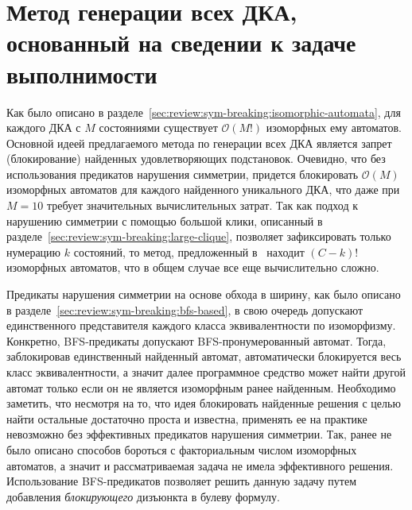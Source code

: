 
\section{Метод генерации всех ДКА, основанный на сведении к задаче выполнимости}
\label{sec:findall:SAT-based}

Как было описано в разделе~\ref{sec:review:sym-breaking:isomorphic-automata}, для каждого ДКА с $M$ состояниями существует $\mathcal{O}\left(M!\right)$ изоморфных ему автоматов.
Основной идеей предлагаемого метода по генерации всех ДКА является запрет (блокирование) найденных удовлетворяющих подстановок.
Очевидно, что без использования предикатов нарушения симметрии, придется блокировать $\mathcal{O}\left(M\right)$ изоморфных автоматов для каждого найденного уникального ДКА, что даже при $M = 10$ требует значительных вычислительных затрат.
Так как подход к нарушению симметрии с помощью большой клики, описанный в разделе~\ref{sec:review:sym-breaking:large-clique}, позволяет зафиксировать только нумерацию $k$ состояний, то метод, предложенный в~\cite{heule-icgi10} находит $\left(C - k\right)!$ изоморфных автоматов, что в общем случае все еще вычислительно сложно.

Предикаты нарушения симметрии на основе обхода в ширину, как было описано в разделе~\ref{sec:review:sym-breaking:bfs-based}, в свою очередь допускают единственного представителя каждого класса эквивалентности по изоморфизму.
Конкретно, BFS-предикаты допускают BFS-пронумерованный автомат.
Тогда, заблокировав единственный найденный автомат, автоматически блокируется весь класс эквивалентности, а значит далее программное средство может найти другой автомат только если он не является изоморфным ранее найденным.
Необходимо заметить, что несмотря на то, что идея блокировать найденные решения с целью найти остальные достаточно проста и известна, применять ее на практике невозможно без эффективных предикатов нарушения симметрии.
Так, ранее не было описано способов бороться с факториальным числом изоморфных автоматов, а значит и рассматриваемая задача не имела эффективного решения.
Использование BFS-предикатов позволяет решить данную задачу путем добавления \emph{блокирующего} дизъюнкта в булеву формулу. 

